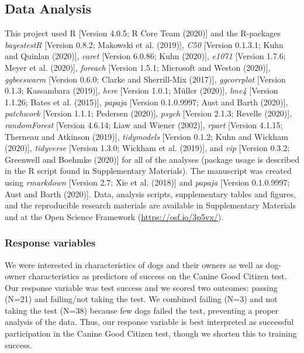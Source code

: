 \documentclass[
  english,
  ,pub,floatsintext]{apa6}
\begin{document}
\hypertarget{data-analysis}{%
\subsection{Data Analysis}\label{data-analysis}}

This project used R {[}Version 4.0.5; R Core Team (2020){]} and the R-packages \emph{bayestestR} {[}Version 0.8.2; Makowski et al. (2019){]}, \emph{C50} {[}Version 0.1.3.1; Kuhn and Quinlan (2020){]}, \emph{caret} {[}Version 6.0.86; Kuhn (2020){]}, \emph{e1071} {[}Version 1.7.6; Meyer et al. (2020){]}, \emph{foreach} {[}Version 1.5.1; Microsoft and Weston (2020){]}, \emph{ggbeeswarm} {[}Version 0.6.0; Clarke and Sherrill-Mix (2017){]}, \emph{ggcorrplot} {[}Version 0.1.3; Kassambara (2019){]}, \emph{here} {[}Version 1.0.1; Müller (2020){]}, \emph{lme4} {[}Version 1.1.26; Bates et al. (2015){]}, \emph{papaja} {[}Version 0.1.0.9997; Aust and Barth (2020){]}, \emph{patchwork} {[}Version 1.1.1; Pedersen (2020){]}, \emph{psych} {[}Version 2.1.3; Revelle (2020){]}, \emph{randomForest} {[}Version 4.6.14; Liaw and Wiener (2002){]}, \emph{rpart} {[}Version 4.1.15; Therneau and Atkinson (2019){]}, \emph{tidymodels} {[}Version 0.1.2; Kuhn and Wickham (2020){]}, \emph{tidyverse} {[}Version 1.3.0; Wickham et al. (2019){]}, and \emph{vip} {[}Version 0.3.2; Greenwell and Boehmke (2020){]} for all of the analyses (package usage is described in the R script found in Supplementary Materials). The manuscript was created using \emph{rmarkdown} {[}Version 2.7; Xie et al. (2018){]} and \emph{papaja} {[}Version 0.1.0.9997; Aust and Barth (2020){]}. Data, analysis scripts, supplementary tables and figures, and the reproducible research materials are available in Supplementary Materials and at the Open Science Framework (\url{https://osf.io/3p5vx/}).

\hypertarget{response-variables}{%
\subsubsection{Response variables}\label{response-variables}}

We were interested in characteristics of dogs and their owners as well as dog-owner characteristics as predictors of success on the Canine Good Citizen test. Our response variable was test success and we scored two outcomes: passing (N=21) and failing/not taking the test. We combined failing (N=3) and not taking the test (N=38) because few dogs failed the test, preventing a proper analysis of the data. Thus, our response variable is best interpreted as successful participation in the Canine Good Citizen test, though we shorten this to training success.
\end{document}
